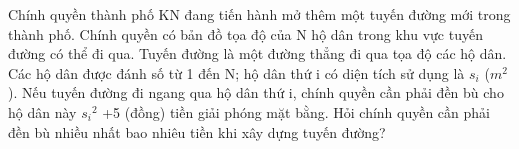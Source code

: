 Chính quyền thành phố KN đang tiến hành mở thêm một tuyến đường mới trong thành phố. Chính quyền có bản đồ tọa độ của N hộ dân trong khu vực tuyến đường có thể đi qua. Tuyến đường là một đường thẳng đi qua tọa độ các hộ dân. Các hộ dân được đánh số từ 1 đến N; hộ dân thứ i có diện tích sử dụng là $s_{i}$   ($m^{2}$   ). Nếu tuyến đường đi ngang qua hộ dân thứ i, chính quyền cần phải đền bù cho hộ dân này $s_{i}$$^    2   $   +5 (đồng) tiền giải phóng mặt bằng. Hỏi chính quyền cần phải đền bù nhiều nhất bao nhiêu tiền khi xây dựng tuyến đường?